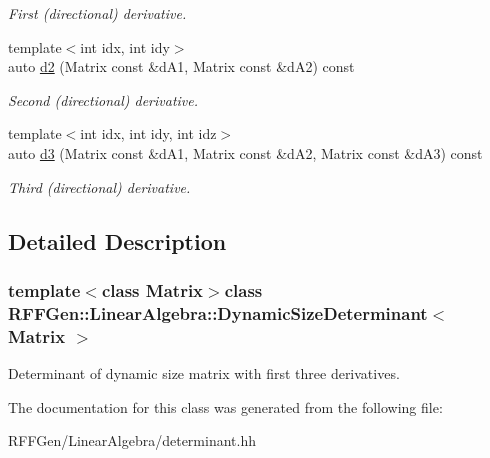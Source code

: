 \begin{DoxyCompactItemize}
\begin{DoxyCompactList}\small\item\em First (directional) derivative. \end{DoxyCompactList}\item 
\hypertarget{classRFFGen_1_1LinearAlgebra_1_1DynamicSizeDeterminant_a8c944d4c6dcc714b265661b6e0c24437}{{\footnotesize template$<$int idx, int idy$>$ }\\auto \hyperlink{classRFFGen_1_1LinearAlgebra_1_1DynamicSizeDeterminant_a8c944d4c6dcc714b265661b6e0c24437}{d2} (Matrix const \&d\-A1, Matrix const \&d\-A2) const }\label{classRFFGen_1_1LinearAlgebra_1_1DynamicSizeDeterminant_a8c944d4c6dcc714b265661b6e0c24437}

\begin{DoxyCompactList}\small\item\em Second (directional) derivative. \end{DoxyCompactList}\item 
\hypertarget{classRFFGen_1_1LinearAlgebra_1_1DynamicSizeDeterminant_a9de4bdf8885f6d5a0449b36d2ff2ab70}{{\footnotesize template$<$int idx, int idy, int idz$>$ }\\auto \hyperlink{classRFFGen_1_1LinearAlgebra_1_1DynamicSizeDeterminant_a9de4bdf8885f6d5a0449b36d2ff2ab70}{d3} (Matrix const \&d\-A1, Matrix const \&d\-A2, Matrix const \&d\-A3) const }\label{classRFFGen_1_1LinearAlgebra_1_1DynamicSizeDeterminant_a9de4bdf8885f6d5a0449b36d2ff2ab70}

\begin{DoxyCompactList}\small\item\em Third (directional) derivative. \end{DoxyCompactList}\end{DoxyCompactItemize}


\subsection{Detailed Description}
\subsubsection*{template$<$class Matrix$>$class R\-F\-F\-Gen\-::\-Linear\-Algebra\-::\-Dynamic\-Size\-Determinant$<$ Matrix $>$}

Determinant of dynamic size matrix with first three derivatives. 

The documentation for this class was generated from the following file\-:\begin{DoxyCompactItemize}
\item 
R\-F\-F\-Gen/\-Linear\-Algebra/determinant.\-hh\end{DoxyCompactItemize}
